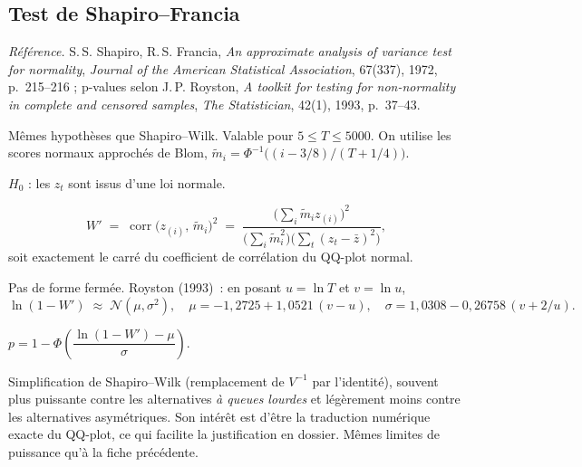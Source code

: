 \documentclass[a4paper,11pt]{article}
\newcommand{\refl}[1]{{\small\textcolor{maincolor!70!black}{\textit{Référence.} #1}}\par\smallskip}
\newcounter{ficheid}
\newenvironment{fiche}[1]{%
  \stepcounter{ficheid}%
  \phantomsection
  \subsection{#1}%
  \label{fiche:\theficheid}%
}{%
  \end{description}\vspace{0.5em}%
}
\newcommand{\Cadre}{%
  \begin{description}[leftmargin=0pt, style=unboxed, itemsep=3pt, topsep=3pt, parsep=2pt]%
  \item[\textcolor{financeblue}{\textbf{1. Cadre, notations et hypothèses de validité (non testées).}}]}
\newcommand{\Hzero}{\item[\textcolor{financeblue}{\textbf{2. Hypothèse nulle.}}]}
\newcommand{\Stat}{\item[\textcolor{financeblue}{\textbf{3. Statistique de test.}}]}
\newcommand{\Loi}{\item[\textcolor{financeblue}{\textbf{4. Loi sous $H_0$.}}]}
\newcommand{\Pval}{\item[\textcolor{financeblue}{\textbf{5. p-value.}}]}
\newcommand{\Usage}{\item[\textcolor{financeblue}{\textbf{6. Usage et limites.}}]}
\begin{document}
\begin{fiche}{Test de Shapiro--Francia}
\refl{S.\,S. Shapiro, R.\,S. Francia, \emph{An approximate analysis of variance test for
normality}, \emph{Journal of the American Statistical Association}, 67(337), 1972, p.~215--216 ;
p-values selon J.\,P. Royston, \emph{A toolkit for testing for non-normality in complete and
censored samples}, \emph{The Statistician}, 42(1), 1993, p.~37--43.}
\Cadre
Mêmes hypothèses que Shapiro--Wilk. Valable pour $5 \le T \le 5000$. On utilise les scores normaux
approchés de Blom, $\tilde m_i = \Phi^{-1}\!\big((i - 3/8)/(T + 1/4)\big)$.
\Hzero
$H_0$ : les $z_t$ sont issus d'une loi normale.
\Stat
\[
  W' \;=\; \operatorname{corr}\big(z_{(i)},\, \tilde m_i\big)^2
  \;=\; \frac{\Big(\sum_i \tilde m_i z_{(i)}\Big)^2}
              {\Big(\sum_i \tilde m_i^2\Big)\Big(\sum_t (z_t-\bar z)^2\Big)} ,
\]
soit exactement le carré du coefficient de corrélation du QQ-plot normal.
\Loi
Pas de forme fermée. Royston (1993)~: en posant $u = \ln T$ et $v = \ln u$,
\[
  \ln(1-W') \;\approx\; \mathcal{N}(\mu, \sigma^2),\quad
  \mu = -1{,}2725 + 1{,}0521\,(v-u),\quad
  \sigma = 1{,}0308 - 0{,}26758\,(v + 2/u).
\]
\Pval
$p = 1 - \Phi\!\left(\dfrac{\ln(1-W') - \mu}{\sigma}\right)$.
\Usage
Simplification de Shapiro--Wilk (remplacement de $V^{-1}$ par l'identité), souvent plus puissante
contre les alternatives \emph{à queues lourdes} et légèrement moins contre les alternatives
asymétriques. Son intérêt est d'être la traduction numérique exacte du QQ-plot, ce qui facilite la
justification en dossier. Mêmes limites de puissance qu'à la fiche précédente.
\end{fiche}
\end{document}
